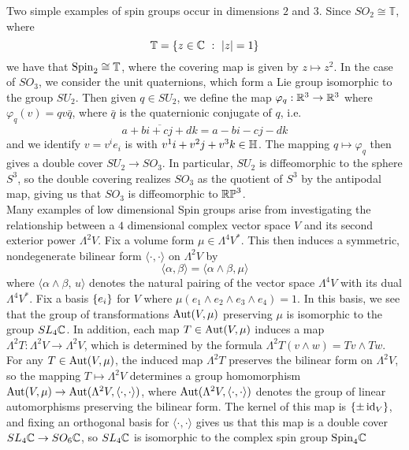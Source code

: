 Two simple examples of spin groups occur in dimensions $2$ and $3$.
Since $SO_2 \cong \mathbb{T}$, where
\[
\mathbb{T} = \left\lbrace z \in \mathbb{C} ~:~ |z| = 1 \right\rbrace
\]
we have that $\mathrm{Spin}_2 \cong \mathbb{T}$, where the covering map is given
by $z \mapsto z^2$. In the case of $SO_3$, we consider the unit quaternions,
which form a Lie group isomorphic to the group $SU_2$. Then given $q \in SU_2$, we define
the map $\varphi_q : \mathbb{R}^3 \to \mathbb{R}^3$ where $\varphi_q(v) = qv\bar{q}$, where
$\bar{q}$ is the quaternionic conjugate of $q$, i.e.
\[
\overline{a + bi + cj +dk} = a -bi -cj -dk
\]
and we identify $v = v^ie_i$ is  with $v^1 i + v^2j + v^3k \in \mathbb{H}$.
The mapping $q \mapsto \varphi_q$ then gives a double cover $SU_2 \to SO_3$.
In particular, $SU_2$ is diffeomorphic to the sphere $S^3$, so the double
covering realizes $SO_3$ as the quotient of $S^3$ by the antipodal map,
giving us that $SO_3$ is diffeomorphic to $\mathbb{RP}^3$. \\

Many examples of low dimensional Spin groups arise from investigating the
relationship between a $4$ dimensional complex vector space $V$ and its second
exterior power $\Lambda^2V$. Fix a volume form $\mu \in \Lambda^4V^*$. This then
induces a symmetric, nondegenerate bilinear form $\langle \cdot,\cdot \rangle$
on $\Lambda^2V$ by
\[
\langle \alpha,\beta \rangle = \langle \alpha \wedge \beta, \mu \rangle
\]
where $\langle \alpha \wedge \beta, \,u \rangle$ denotes the natural pairing of
the vector space $\Lambda^4V$ with its dual $\Lambda^4V^*$. Fix a basis
$\left\lbrace e_i \right\rbrace$ for $V$ where $\mu(e_1 \wedge e_2 \wedge e_3 \wedge e_4) = 1$. In this basis,
we see that the group of transformations $\operatorname{Aut}(V, \mu)$ preserving $\mu$ is
isomorphic to the group $SL_4\mathbb{C}$. In addition, each map $T \in \operatorname{Aut}(V, \mu)$
induces a map $\Lambda^2 T : \Lambda^2V \to \Lambda^2V$, which is determined
by the formula $\Lambda^2 T(v \wedge w) = Tv \wedge Tw$. For any $T \in \operatorname{Aut}(V, \mu)$,
the induced map $\Lambda^2 T$ preserves the bilinear form on $\Lambda^2V$, so the
mapping $T \mapsto \Lambda^2V$ determines a group homomorphism
$\operatorname{Aut}(V, \mu) \to \operatorname{Aut}(\Lambda^2V, \langle \cdot,\cdot \rangle)$, where
$\operatorname{Aut}(\Lambda^2V,\langle\cdot,\cdot\rangle)$ denotes the group of linear automorphisms
preserving the bilinear form. The kernel of this map is $\left\lbrace \pm \operatorname{id}_V \right\rbrace$, and fixing
an orthogonal basis for $\langle\cdot,\cdot\rangle$ gives us that this map is
a double cover $SL_4\mathbb{C} \to SO_6\mathbb{C}$, so $SL_4\mathbb{C}$ is isomorphic to the
complex spin group $\mathrm{Spin}_4\mathbb{C}$ \\

